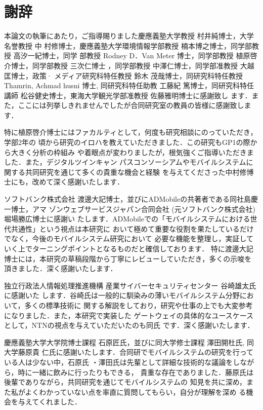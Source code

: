 \chapter*{謝辞}

本論文の執筆にあたり，ご指導賜りました慶應義塾大学教授 村井純博士，大学名誉教授 中
村修博士，慶應義塾大学環境情報学部教授 楠本博之博士，同学部教授 高汐一紀博士，同学
部教授 Rodney D．Van Meter 博士，同学部教授 植原啓介博士，同学部教授 三次仁博士
，同学部教授 中澤仁博士，同学部准教授 大越匡博士，政策· メディア研究科特任教授 鈴木
茂哉博士，同研究科特任教授 Thamrin, Achmad husni 博士, 同研究科特任助教 工藤紀
篤博士，同研究科特任講師 松谷健史博士，東海大学観光学部准教授 佐藤雅明博士に感謝致し
ます．また，ここには列挙しきれませんでしたが合同研究室の教員の皆様に感謝致します．

特に植原啓介博士にはファカルティとして，何度も研究相談にのっていただき，学部2年の
頃から研究のイロハを教えていただきました．この研究もGP1の際から大きく分析の枠組み
や着眼点が変わりましたが，根気強くご指導いただきました．また，デジタルツインキャン
パスコンソーシアムやモバイルシステムに関する共同研究を通じて多くの貴重な機会と経験
を与えてくださった中村修博士にも，改めて深く感謝いたします．

ソフトバンク株式会社 渡邊大記博士，並びにADMobileの共著者である同社島慶一博士，アマ
ゾンウェブサービスジャパン合同会社 (元ソフトバンク株式会社) 堀場勝広博士に感謝い
たします．ADMobileでの「モバイルシステムにおける世代共通性」という視点は本研究に
おいて極めて重要な役割を果たしているだけでなく，今後のモバイルシステム研究において
必要な機能を整理し，実証していく上でターニングポイントとなるものだと確信しております．
特に渡邊大記博士には，本研究の草稿段階から丁寧にレビューしていただき，多くの示唆を
頂きました．深く感謝いたします．

独立行政法人情報処理推進機構 産業サイバーセキュリティセンター 谷崎雄太氏に感謝いた
します．谷崎氏は一般的に馴染みの薄いモバイルシステム分野において，多くの標準技術に
関する解説をしており，研究や仕事の上でも大変参考になりました．また，本研究で実装した
ゲートウェイの具体的なユースケースとして，NTNの視点を与えていただいたのも同氏
です．深く感謝いたします．

慶應義塾大学大学院博士課程 石原匠氏，並びに同大学修士課程 澤田開杜氏, 同大学藤原貴
仁氏に感謝いたします．合同研でモバイルシステムの研究を行っている人は少ない中，石原氏
・澤田氏は先輩として詳細な技術的な議論をしながら，時に一緒に飲みに行ったりもできる，
貴重な存在でありました．藤原氏は後輩でありながら，共同研究を通じてモバイルシステムの
知見を共に深め，また私がよくわかっていない点を率直に質問してもらい，自分が理解を深め
る機会を与えてくれました．

